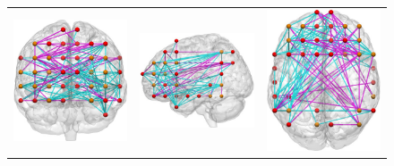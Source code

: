 \begin{figure}[ptbh]
\begin{tabular}{ccc}
		\includegraphics[height=\imheight]{6-7_anterior_flas.jpg}  &
		\includegraphics[height=\imheight]{6-7_lateral_flas.jpg}  &
		\includegraphics[height=\imheight]{6-7_superior_flas.jpg} \VSPACEE\\

\end{tabular}
\end{figure}
